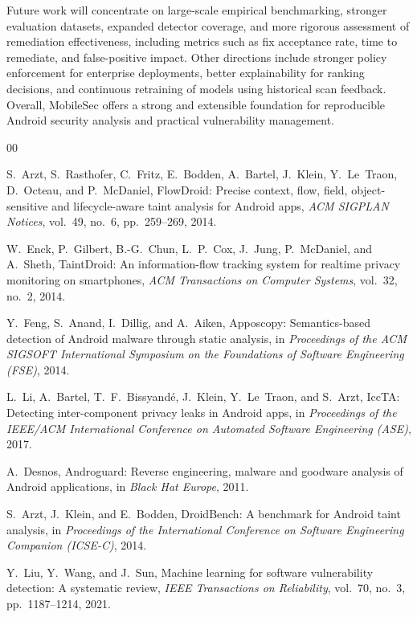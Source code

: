 \documentclass[preprint,12pt, a4paper]{elsarticle}
\begin{document}
Future work will concentrate on large-scale empirical benchmarking, stronger evaluation datasets, expanded detector coverage, and more rigorous assessment of remediation effectiveness, including metrics such as fix acceptance rate, time to remediate, and false-positive impact. Other directions include stronger policy enforcement for enterprise deployments, better explainability for ranking decisions, and continuous retraining of models using historical scan feedback. Overall, MobileSec offers a strong and extensible foundation for reproducible Android security analysis and practical vulnerability management.

\begin{thebibliography}{00}

S.~Arzt, S.~Rasthofer, C.~Fritz, E.~Bodden, A.~Bartel, J.~Klein, Y.~Le~Traon,
D.~Octeau, and P.~McDaniel,
FlowDroid: Precise context, flow, field, object-sensitive and lifecycle-aware taint analysis for Android apps,
\textit{ACM SIGPLAN Notices}, vol.~49, no.~6, pp.~259--269, 2014.

W.~Enck, P.~Gilbert, B.-G.~Chun, L.~P.~Cox, J.~Jung, P.~McDaniel, and A.~Sheth,
TaintDroid: An information-flow tracking system for realtime privacy monitoring on smartphones,
\textit{ACM Transactions on Computer Systems}, vol.~32, no.~2, 2014.

Y.~Feng, S.~Anand, I.~Dillig, and A.~Aiken,
Apposcopy: Semantics-based detection of Android malware through static analysis,
in \textit{Proceedings of the ACM SIGSOFT International Symposium on the Foundations of Software Engineering (FSE)}, 2014.

L.~Li, A.~Bartel, T.~F.~Bissyand\'e, J.~Klein, Y.~Le~Traon, and S.~Arzt,
IccTA: Detecting inter-component privacy leaks in Android apps,
in \textit{Proceedings of the IEEE/ACM International Conference on Automated Software Engineering (ASE)}, 2017.

A.~Desnos,
Androguard: Reverse engineering, malware and goodware analysis of Android applications,
in \textit{Black Hat Europe}, 2011.

S.~Arzt, J.~Klein, and E.~Bodden,
DroidBench: A benchmark for Android taint analysis,
in \textit{Proceedings of the International Conference on Software Engineering Companion (ICSE-C)}, 2014.

Y.~Liu, Y.~Wang, and J.~Sun,
Machine learning for software vulnerability detection: A systematic review,
\textit{IEEE Transactions on Reliability}, vol.~70, no.~3, pp.~1187--1214, 2021.


\end{thebibliography}
\end{document}
